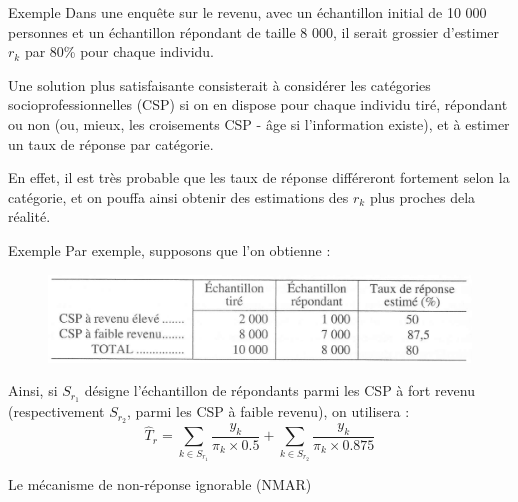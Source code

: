 \begin{frame}{Exemple}
	Dans une enquête sur le revenu, avec un échantillon initial de 10 000 personnes et un échantillon répondant de taille 8 000, il serait grossier d'estimer $r_k$ par 80\% pour chaque individu. \\ \vspace{0.3cm}
	
	Une solution plus satisfaisante consisterait à considérer les catégories socioprofessionnelles (CSP) si on en dispose pour chaque individu tiré, répondant ou non (ou, mieux, les croisements CSP - âge si l'information existe), et à estimer un taux de réponse
	par catégorie. \\ \vspace{0.3cm}
	
	En effet, il est très probable que les taux de réponse différeront fortement
	selon la catégorie, et on pouffa ainsi obtenir des estimations des $r_k$ plus proches dela réalité. \\ 
	
	
\end{frame}

\begin{frame}{Exemple}
	Par exemple, supposons que l'on obtienne :
	
	\begin{figure}[h]
		\centering
		\includegraphics[width=1\textwidth]{img/e.png}
	\end{figure}
	
	Ainsi, si $S_{r_1}$ désigne l'échantillon de répondants parmi les CSP à fort revenu (respectivement $S_{r_2}$, parmi les CSP à faible revenu), on utilisera : 
	$$ \hat{T}_r = \sum_{k \in S_{r_1}} \frac{y_k}{\pi_k \times 0.5} + \sum_{k \in S_{r_2}} \frac{y_k}{\pi_k \times 0.875}$$
	
\end{frame}


\begin{frame}{}
	
	\huge \begin{center}
		Le mécanisme de non-réponse ignorable (NMAR)
	\end{center}
	
\end{frame}



